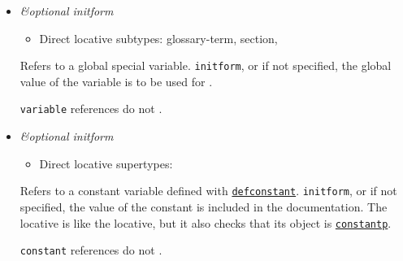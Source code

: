 \begin{itemize}
\item
  \label{x-28VARIABLE-20MGL-PAX-3ALOCATIVE-29}
  \emph{\&optional initform}

  \begin{itemize}
  \tightlist
  \item
    Direct locative subtypes: glossary-term, section,
  \end{itemize}

  Refers to a global special variable. \texttt{initform}, or if not
  specified, the global value of the variable is to be used for
  .

\begin{Shaded}
\begin{Highlighting}[]
 \NormalTok{)}
\end{Highlighting}
\end{Shaded}

  \texttt{variable} references do not
  .
\item
  \label{x-28MGL-PAX-3ACONSTANT-20MGL-PAX-3ALOCATIVE-29}
  \emph{\&optional initform}

  \begin{itemize}
  \tightlist
  \item
    Direct locative supertypes:
  \end{itemize}

  Refers to a constant variable defined with
  \href{http://www.lispworks.com/documentation/HyperSpec/Body/m_defcon.htm}{\texttt{defconstant}}.
  \texttt{initform}, or if not specified, the value of the constant is
  included in the documentation. The
  locative is like the
  locative, but it also checks that its object is
  \href{http://www.lispworks.com/documentation/HyperSpec/Body/f_consta.htm}{\texttt{constantp}}.

  \texttt{constant} references do not
  .
\end{itemize}

